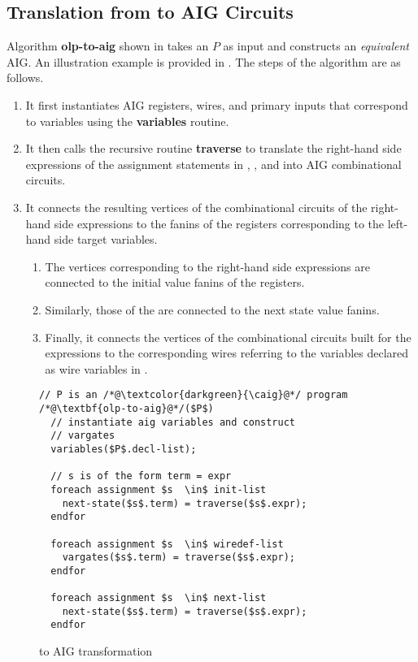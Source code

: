 \subsection{Translation from \caig to AIG Circuits}
%
Algorithm {\bf olp-to-aig} shown in   
takes an \caig $P$ as input and constructs an {\em equivalent}
AIG. An illustration example is provided in  
.
%
The steps of the algorithm are as follows.
%
\begin{enumerate}
  \item It first instantiates AIG 
registers, wires, and primary
inputs that correspond to \caig variables 
using the {\bf variables} routine.

\item It then calls the recursive routine {\bf traverse} 
  to translate the right-hand side expressions 
of the assignment statements in 
    , ,
and  into AIG combinational circuits. 
\item It connects the resulting vertices of the combinational 
circuits of the right-hand side expressions to the fanins of the registers corresponding to the left-hand side target variables. 
    \begin{enumerate}
\item The vertices corresponding to the  
  right-hand side expressions are connected to the  
  initial value fanins of the registers. 
\item Similarly, those of the  are connected to 
  the next state value fanins. 
\item Finally, it connects the vertices of the combinational 
  circuits built for the  expressions to 
  the corresponding wires referring to the 
  variables declared as wire variables in .
    \end{enumerate}
\end{enumerate}
\begin{figure}
\begin{lstlisting}
// P is an /*@\textcolor{darkgreen}{\caig}@*/ program
/*@\textbf{olp-to-aig}@*/($P$) 
  // instantiate aig variables and construct
  // vargates
  variables($P$.decl-list); 
  
  // s is of the form term = expr 
  foreach assignment $s  \in$ init-list 
    next-state($s$.term) = traverse($s$.expr);  
  endfor
  
  foreach assignment $s  \in$ wiredef-list
    vargates($s$.term) = traverse($s$.expr);  
  endfor
  
  foreach assignment $s  \in$ next-list
    next-state($s$.term) = traverse($s$.expr);  
  endfor
\end{lstlisting}
\vspace*{-1em}
\caption{\caig to AIG transformation }
\label{fig:olp2aig}
\end{figure}
%
